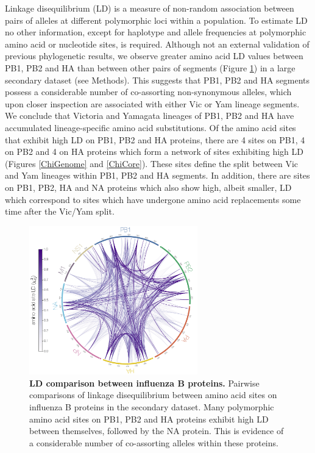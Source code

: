 \documentclass[11pt,oneside,letterpaper]{article}
\begin{document}
Linkage disequilibrium (LD) is a measure of non-random association between pairs of alleles at different polymorphic loci within a population.
To estimate LD no other information, except for haplotype and allele frequencies at polymorphic amino acid or nucleotide sites, is required.
Although not an external validation of previous phylogenetic results, we observe greater amino acid LD values between PB1, PB2 and HA than between other pairs of segments (Figure \ref{segmentLD}) in a large secondary dataset (see Methods).
This suggests that PB1, PB2 and HA segments possess a considerable number of co-assorting non-synonymous alleles, which upon closer inspection are associated with either Vic or Yam lineage segments.
We conclude that Victoria and Yamagata lineages of PB1, PB2 and HA have accumulated lineage-specific amino acid substitutions.
Of the amino acid sites that exhibit high LD on PB1, PB2 and HA proteins, there are 4 sites on PB1, 4 on PB2 and 4 on HA proteins which form a network of sites exhibiting high LD (Figures \ref{ChiGenome} and \ref{ChiCore}).
These sites define the split between Vic and Yam lineages within PB1, PB2 and HA segments.
In addition, there are sites on PB1, PB2, HA and NA proteins which also show high, albeit smaller, LD which correspond to sites which have undergone amino acid replacements some time after the Vic/Yam split.

\begin{figure}[h]
	\centering	
	\includegraphics[width=0.65\textwidth]{figures/InfB_LDcircle.1600.aa.ChiSqdf.minorCutoff1percent.png}
	\caption{\textbf{LD comparison between influenza B proteins.}
Pairwise comparisons of linkage disequilibrium between amino acid sites on influenza B proteins in the secondary dataset.
Many polymorphic amino acid sites on PB1, PB2 and HA proteins exhibit high LD between themselves, followed by the NA protein.
This is evidence of a considerable number of co-assorting alleles within these proteins.}
	\label{segmentLD}
\end{figure}
\end{document}

